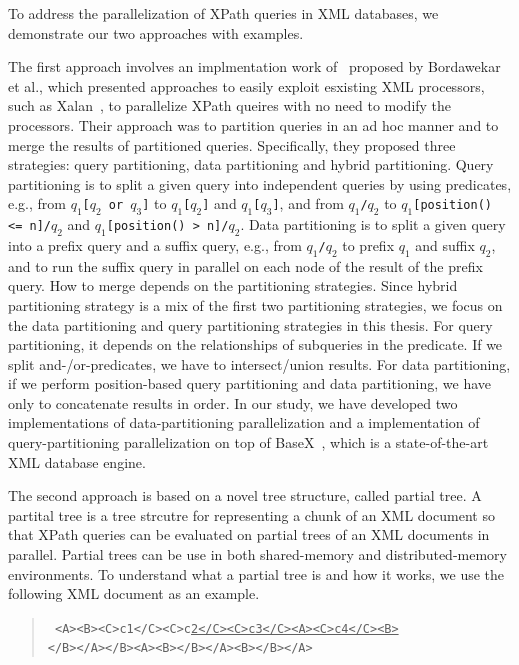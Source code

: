 To address the parallelization of XPath queries in XML databases, we demonstrate
our two approaches with examples.

The first approach involves an implmentation work of~\cite{BoLS09} proposed by
Bordawekar et al., which presented approaches to easily exploit esxisting XML
processors, such as Xalan~\cite{xalan}, to parallelize XPath queires with no
need to modify  the processors. Their approach was to partition queries in an ad
hoc manner and to merge the results of partitioned queries. Specifically, they
proposed three strategies: query partitioning, data partitioning and hybrid
partitioning. Query partitioning is to split a given query into independent
queries by using predicates, e.g., from \texttt{$q_1$[$q_2$ or $q_3$]} to
\texttt{$q_1$[$q_2$]} and \texttt{$q_1$[$q_3$]}, and from \texttt{$q_1$/$q_2$}
to \texttt{$q_1$[position() <= n]/$q_2$} and \texttt{$q_1$[position() >
n]/$q_2$}. Data partitioning is to split a given query into a prefix query and a
suffix query, e.g., from \texttt{$q_1$/$q_2$} to prefix $q_1$ and suffix $q_2$,
and to run the suffix query in parallel on each node of the result of the prefix
query. How to merge depends on the partitioning strategies.  Since hybrid
partitioning strategy is a mix of the first two partitioning strategies, we
focus on the data partitioning and query partitioning strategies in this thesis.
For query partitioning, it depends on the relationships of subqueries in the
predicate. If we split and-/or-predicates, we have to intersect/union results.
For data partitioning, if we perform position-based query partitioning and data
partitioning, we have only to concatenate results in order. In our study, we
have developed two implementations of data-partitioning parallelization and a
implementation of query-partitioning parallelization on top of
BaseX~\cite{basex864}, which is a state-of-the-art XML database engine.

The second approach is based on a novel tree structure, called partial tree. A
partital tree is a tree strcutre for representing a chunk of an XML document so
that XPath queries can be evaluated on partial trees of an XML documents in
parallel. Partial trees can be use in both shared-memory and distributed-memory
environments. To understand what a partial tree is and how it works, we use the
following XML document as an example.

\begin{quote}\small\tt
<A><B><C>c1</C><C>c\underline{2</C><C>c3</C><A><C>c4</C><B>}\\
</B></A></B><A><B></B></A><B></B></A> \end{quote}

